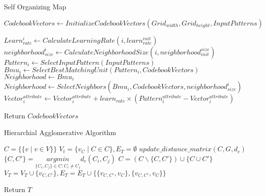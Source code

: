 \documentclass[a4paper]{article}
\begin{document}
  \begin{algorithm}
   \caption{Self Organizing Map ~\cite{som3} }
    \begin{algorithmic}[1]
     \State $CodebookVectors \leftarrow InitializeCodebookVectors(Grid_{width},Grid_{height},InputPatterns) $
     
    
            \State $Learn_{rate}^i \leftarrow CalculateLearningRate(i,learn_{rate}^{init})$
            \State $neighborhood_{size}^i \leftarrow CalculateNeighborhoodSize(i,neighborhood_{init}^{size})$
            \State $Pattern_i \leftarrow SelectInputPattern(InputPatterns)$
             \State $Bmu_i \leftarrow SelectBestMatchingUnit(Pattern_i,CodebookVectors)$
             \State $Neighborhood \leftarrow Bmu_i$
              \State $Neighborhood \leftarrow  SelectNeighbors(Bmu_i,CodebookVectors,neighborhood_{size}^i)$
            \State $Vector_i^{attribute} \leftarrow Vector_i^{attribute} + learn_{rate} \times (Pattern_i ^{attribute} - Vector_i ^{attribute})  $
            \EndFor
          
            
            \EndFor
           
        \EndFor
        
       
       \State Return $CodebookVectors$



 

\end{algorithmic}
\end{algorithm}


  \begin{algorithm}
   \caption{Hierarchial Agglomerative Algorithm ~\cite{haa1}}
    \begin{algorithmic}[1]
     \State $C = \{\{v\mid v \in V\}\} $ 
     \State $V_t = \{v_C\mid C \in C\},E_T = \emptyset$ 
     \State $update\_distance\_matrix(C,G,d_c)$
     \State $\{C,C'\} =  \underset{\{C_i,C_j\} \in C : C_i \neq C_j}{argmin} d_c (C_i,C_j)$
     \State $C = (C \backslash \{C,C'\}) \cup \{C \cup C'\}$ 
     \State $V_T = V_T \cup \{v_{C,C'}\},E_T = E_T \cup \{\{v_{C,C'} ,v_{C}\},\{v_{C,C'} ,v_{C}\}\}$ 
     \EndWhile
    
      
        
       
       \State Return $T$



 

\end{algorithmic}
\end{algorithm}
\end{document}
